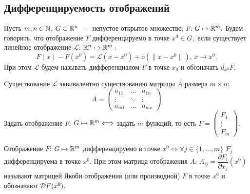 \subsection{Дифференцируемость отображений} 

\begin{definition}
    Пусть $m, n \in \mathbb{N}$, $G \subset \mathbb{R}^{n}$~---~непустое открытое множество, $F$: $G \mapsto \mathbb{R}^{m}.$ Будем говорить, что отображение $F$ дифференцируемо в точке $x^0 \in G,$ если существует линейное отображение $\mathcal{L}$: $\mathbb{R}^n \mapsto \mathbb{R}^m:$
$$F(x) - F(x^{0}) = \mathcal{L}(x-x^0) + \overline{o}(\|x - x^{0}\|)\text{, }x\rightarrow x^{0}.$$ При этом $\mathcal{L}$ будем называть дифференциалом $F$ в точке $x_0$ и обозначать $d_{x^0}F.$ 
\end{definition}

\begin{note}
    Cуществование $\mathcal{L}$ эквивалентно существованию матрицы $A$ размера $m \times n:$
    $$ A = \begin{pmatrix}
  a_{11}& \ldots & a_{1n}\\
  \vdots & \ddots & \vdots \\
  a_{m1}& \ldots & a_{mn}
\end{pmatrix}$$
Задать отображение $F$: $G \mapsto \mathbb{R}^{m} \Longleftrightarrow$ задать $m$ функций, то есть $F = \begin{pmatrix}
    F_{1}\\
    \vdots \\
    F_{m}
\end{pmatrix}$.
\end{note}

\begin{proposition}
    Отображение $F$: $G \mapsto \mathbb{R}^{m}$ дифференцируемо в точке $x^{0} \Longleftrightarrow \forall j \in \{1, \ldots, m\}$ $F_j$ дифференцируема в точке $x^{0}.$ При этом матрица отображения $A$: $A_{ij} = \dfrac{\partial F_i}{\partial x_j} (x^0)$ называют матрицей Якоби отображения (или производной) $F$ в точке $x^{0}$ и обозначают $\mathcal{D} F(x^0)$. 
\end{proposition}

